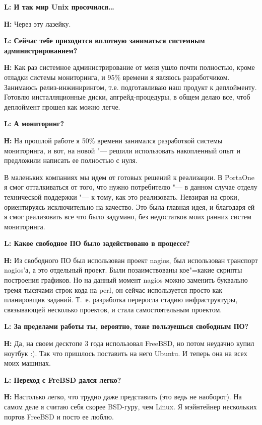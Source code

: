\documentclass[10pt, a5paper]{article}
\begin{document}
{\noindent \bf L: И так мир Unix просочился\ldots}

{\noindent \bf Н:} Через эту лазейку.

{\noindent \bf L: Сейчас тебе приходится вплотную заниматься системным администрированием?}

{\noindent \bf Н:} Как раз системное администрирование от меня ушло почти полностью, кроме отладки системы мониторинга, и 95\% времени я являюсь разработчиком. Занимаюсь релиз-инжинирингом, т.е. подготавливаю наш продукт к деплойменту. Готовлю инсталляционные диски, апгрейд-процедуры, в общем делаю все, чтоб деплоймент прошел как можно легче. 

{\noindent \bf L: А мониторинг?}

{\noindent \bf Н:} На прошлой работе я 50\% времени занимался разработкой системы мониторинга, и вот, на новой "--- решили использовать накопленный опыт и предложили написать ее полностью с нуля.

В маленьких компаниях мы идем от готовых решений к реализации. В PortaOne я смог отталкиваться от того, что нужно потребителю "--- в данном случае отделу технической поддержки "--- к тому, как это реализовать. Невзирая на сроки, ориентируясь исключительно на качество. Это была главная идея, и благодаря ей я смог реализовать все что было задумано, без недостатков моих ранних систем мониторинга.

{\noindent \bf L: Какое свободное ПО было задействовано в процессе?}

{\noindent \bf Н:} Из свободного ПО был использован проект nagios, был использован транспорт nagios'а, а это отдельный проект. Были позаимствованы кое"=какие скрипты построения графиков. Но на данный момент nagios можно заменить буквально тремя тысячами строк кода на perl, он сейчас используется просто как планировщик заданий. Т.~е. разработка переросла стадию инфраструктуры, связывающей несколько проектов, и стала самостоятельным проектом.

{\noindent \bf L: За пределами работы ты, вероятно, тоже пользуешься свободным ПО?}

{\noindent \bf Н:} Да, на своем десктопе 3 года использовал FreeBSD, но потом неудачно купил ноутбук :). Так что пришлось поставить на него Ubuntu. И теперь она на всех моих машинах.

{\noindent \bf L: Переход с FreBSD дался легко?}

{\noindent \bf Н:} Настолько легко, что трудно даже представить (это ведь не наоборот). На самом деле я считаю себя скорее BSD-гуру, чем Linux. Я мэйнтейнер нескольких портов FreeBSD и посто ее люблю.
\end{document}
